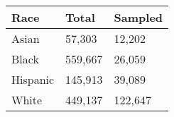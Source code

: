 \begin{tabular}{lll}
\toprule
Race & Total & Sampled \\
\midrule
Asian & 57,303 & 12,202 \\
Black & 559,667 & 26,059 \\
Hispanic & 145,913 & 39,089 \\
White & 449,137 & 122,647 \\
\bottomrule
\end{tabular}
